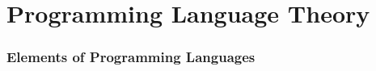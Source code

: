 
\part*{Programming Language Theory}






\toclineskip
\section{Elements of Programming Languages}




